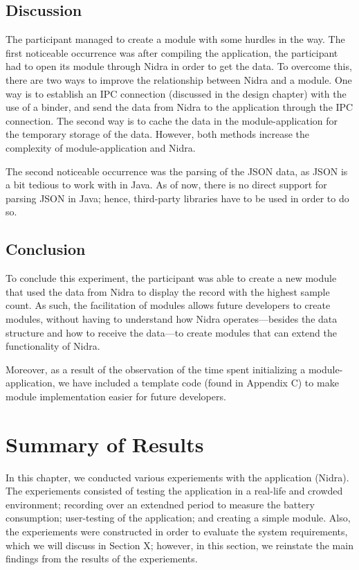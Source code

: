 \subsection{Discussion}

The participant managed to create a module with some hurdles in the way. The first noticeable occurrence was after compiling the application, the participant had to open its module through Nidra in order to get the data. To overcome this, there are two ways to improve the relationship between Nidra and a module. One way is to establish an IPC connection (discussed in the design chapter) with the use of a binder, and send the data from Nidra to the application through the IPC connection. The second way is to cache the data in the module-application for the temporary storage of the data. However, both methods increase the complexity of module-application and Nidra. 

The second noticeable occurrence was the parsing of the JSON data, as JSON is a bit tedious to work with in Java. As of now, there is no direct support for parsing JSON in Java; hence, third-party libraries have to be used in order to do so. 

\subsection{Conclusion}

To conclude this experiment, the participant was able to create a new module that used the data from Nidra to display the record with the highest sample count. As such, the facilitation of modules allows future developers to create modules, without having to understand how Nidra operates---besides the data structure and how to receive the data---to create modules that can extend the functionality of Nidra.

Moreover, as a result of the observation of the time spent initializing a module-application, we have included a template code (found in Appendix C) to make module implementation easier for future developers. 




\section{Summary of Results}

In this chapter, we conducted various experiements with  the application (Nidra). The experiements consisted of testing the application in a real-life and crowded environment; recording over an extendned period to measure the battery consumption; user-testing of the application; and creating a simple module. Also, the experiements were constructed in order to evaluate the system requirements, which we will discuss in Section X; however, in this section, we reinstate the main findings from the results of the experiements.

